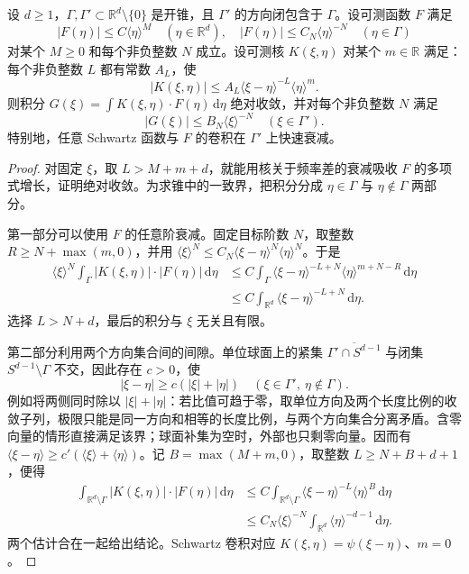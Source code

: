 \begin{lemma}[锥内快速衰减的保持]\label{b2:lem:G-conic-decay}
设 \(d\ge1\)，\(\Gamma,\Gamma'\subset\mathbb R^d\setminus\{0\}\) 是开锥，且 \(\Gamma'\) 的方向闭包含于 \(\Gamma\)。设可测函数 \(F\) 满足
\[
 |F(\eta)|\le C\langle\eta\rangle^M
 \quad(\eta\in\mathbb R^d),
 \quad
 |F(\eta)|\le C_N\langle\eta\rangle^{-N}
 \quad(\eta\in\Gamma)
\]
对某个 \(M\ge0\) 和每个非负整数 \(N\) 成立。设可测核 \(K(\xi,\eta)\) 对某个 \(m\in\mathbb R\) 满足：每个非负整数 \(L\) 都有常数 \(A_L\)，使
\[
 |K(\xi,\eta)|\le A_L\langle\xi-\eta\rangle^{-L}
                              \langle\eta\rangle^m.
\]
则积分 \(G(\xi)=\int K(\xi,\eta)\cdot F(\eta)\,\mathrm d\eta\) 绝对收敛，并对每个非负整数 \(N\) 满足
\[
 |G(\xi)|\le B_N\langle\xi\rangle^{-N}
 \quad(\xi\in\Gamma').
\]
特别地，任意 Schwartz 函数与 \(F\) 的卷积在 \(\Gamma'\) 上快速衰减。
\end{lemma}
\begin{proof}
对固定 \(\xi\)，取 \(L>M+m+d\)，就能用核关于频率差的衰减吸收 \(F\) 的多项式增长，证明绝对收敛。为求锥中的一致界，把积分分成 \(\eta\in\Gamma\) 与 \(\eta\notin\Gamma\) 两部分。

第一部分可以使用 \(F\) 的任意阶衰减。固定目标阶数 \(N\)，取整数 \(R\ge N+\max(m,0)\)，并用
\(\langle\xi\rangle^N\le C_N\langle\xi-\eta\rangle^N\langle\eta\rangle^N\)。于是
\[
 \begin{aligned}
 \langle\xi\rangle^N
   \int_\Gamma|K(\xi,\eta)|\cdot|F(\eta)|\,\mathrm d\eta
 &\le C\int_\Gamma
     \langle\xi-\eta\rangle^{-L+N}
     \langle\eta\rangle^{m+N-R}\,\mathrm d\eta\\
 &\le C\int_{\mathbb R^d}
     \langle\xi-\eta\rangle^{-L+N}\,\mathrm d\eta.
 \end{aligned}
\]
选择 \(L>N+d\)，最后的积分与 \(\xi\) 无关且有限。

第二部分利用两个方向集合间的间隙。单位球面上的紧集
\(\overline{\Gamma'\cap S^{d-1}}\) 与闭集
\(S^{d-1}\setminus\Gamma\) 不交，因此存在 \(c>0\)，使
\[
 |\xi-\eta|\ge c(|\xi|+|\eta|)
 \quad(\xi\in\Gamma',\ \eta\notin\Gamma).
\]
例如将两侧同时除以 \(|\xi|+|\eta|\)：若比值可趋于零，取单位方向及两个长度比例的收敛子列，极限只能是同一方向和相等的长度比例，与两个方向集合分离矛盾。含零向量的情形直接满足该界；球面补集为空时，外部也只剩零向量。因而有
\(\langle\xi-\eta\rangle\ge c'(\langle\xi\rangle+\langle\eta\rangle)\)。记 \(B=\max(M+m,0)\)，取整数 \(L\ge N+B+d+1\)，便得
\[
 \begin{aligned}
 \int_{\mathbb R^d\setminus\Gamma}
       |K(\xi,\eta)|\cdot|F(\eta)|\,\mathrm d\eta
 &\le C\int_{\mathbb R^d\setminus\Gamma}
       \langle\xi-\eta\rangle^{-L}\langle\eta\rangle^B
          \,\mathrm d\eta\\
 &\le C_N\langle\xi\rangle^{-N}
          \int_{\mathbb R^d}\langle\eta\rangle^{-d-1}\,\mathrm d\eta.
 \end{aligned}
\]
两个估计合在一起给出结论。Schwartz 卷积对应
\(K(\xi,\eta)=\psi(\xi-\eta)\)、\(m=0\)。
\end{proof}


